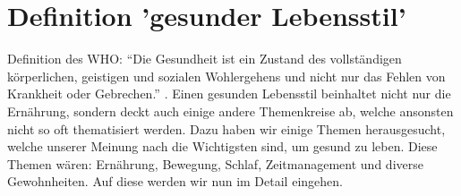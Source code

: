 \chapter{Definition 'gesunder Lebensstil'}
\authortoc{\bastian}{\chapterident}
Definition des WHO: “Die Gesundheit ist ein Zustand des vollständigen körperlichen, geistigen und sozialen Wohlergehens und nicht nur das Fehlen von Krankheit oder Gebrechen.” \cite{gesundheit_definition}.
\newline
Einen gesunden Lebensstil beinhaltet nicht nur die Ernährung, sondern deckt auch einige andere Themenkreise ab, welche ansonsten nicht so oft thematisiert werden. Dazu haben wir einige Themen herausgesucht, welche unserer Meinung nach die Wichtigsten sind, um gesund zu leben. Diese Themen wären: Ernährung, Bewegung, Schlaf, Zeitmanagement und diverse Gewohnheiten. Auf diese werden wir nun im Detail eingehen.
